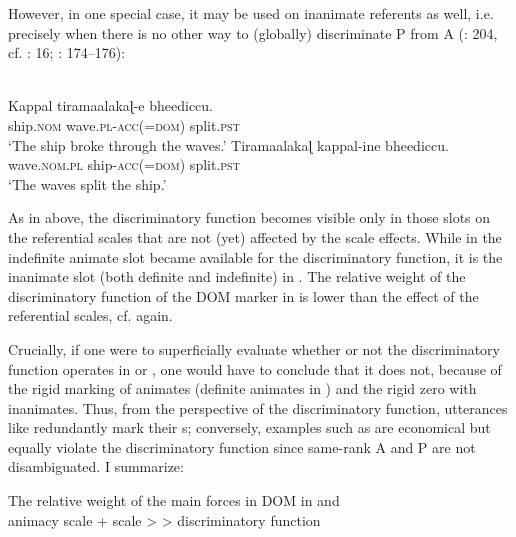 \documentclass[output=paper]{langsci/langscibook}
\begin{document}
\noindent However, in one special case, it may be used on inanimate referents as well, i.e. precisely when there is no other way to (globally) discriminate P from A (\citealt{AsherKumari1997}: 204, cf. \citealt{Stiebels2002}: 16; \citealt{Subbārāo2012}: 174\-–176):

\ea\label{ex:serzant:11}
\\
\ea
\gll Kappal   tiramaalakaɭ{}-e   bheediccu.\\
     ship.\textsc{nom}   wave.\textsc{pl-acc(=dom)}  split.\textsc{pst}\\
\glt ‘The ship broke through the waves.’
\ex
\gll Tiramaalakaɭ kappal-ine     bheediccu.\\
     wave.\textsc{nom.pl}     ship-\textsc{acc(=dom)}   split.\textsc{pst}\\
\glt ‘The waves split the ship.’
\z
\z

As in  above, the discriminatory function becomes visible only in those slots on the referential scales that are not (yet) affected by the scale effects. While in  the indefinite animate slot became available for the discriminatory function, it is the inanimate slot (both definite and indefinite) in . The relative weight of the discriminatory function of the DOM marker in  is lower than the effect of the referential scales, cf.  again. 

Crucially, if one were to superficially evaluate whether or not the discriminatory function operates in  or , one would have to conclude that it does not, because of the rigid marking of animates (definite  animates in ) and the rigid zero with inanimates. Thus, from the perspective of the discriminatory function, utterances like  redundantly mark their s; conversely, examples such as  are economical but equally violate the discriminatory function since same-rank A and P are not disambiguated. I summarize:

\ea\label{ex:serzant:12}
The relative weight of the main forces in DOM in  and \\
animacy scale +  scale >  > discriminatory function\\
\z
\end{document}
